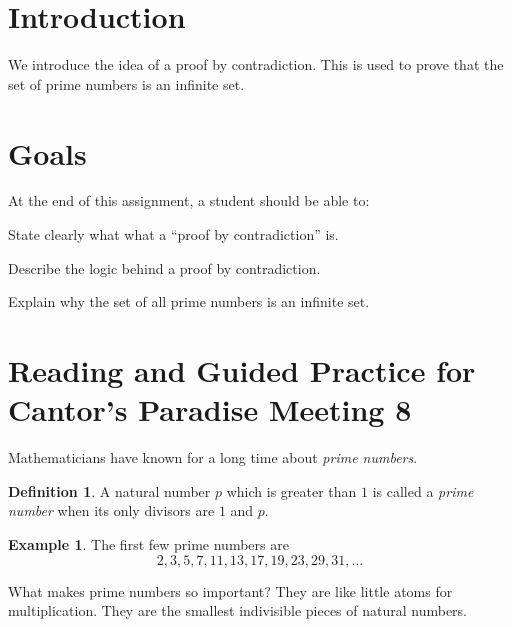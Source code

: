 \documentclass[12pt,letterpaper]{article}
\theoremstyle{definition}
\newtheorem{example}{Example}
\newtheorem*{definition}{Definition}
\begin{document}
\setlength{\parskip}{1ex plus 0.5ex minus 0.2ex}
\setlength{\parindent}{0pt}

\pagestyle{fancy}
\cfoot{}

\section*{Introduction}
We introduce the idea of a proof by contradiction.
This is used to prove that the set of prime numbers is an infinite set.

\section*{Goals}
At the end of this assignment, a student should be able to:
\begin{compactitem}
\item State clearly what what a ``proof by contradiction'' is.
\item Describe the logic behind a proof by contradiction.
\item Explain why the set of all prime numbers is an infinite set.
\end{compactitem}


\section*{Reading and Guided Practice for Cantor's Paradise Meeting 8}

Mathematicians have known for a long time about \emph{prime numbers}.

\begin{definition} 
A natural number $p$ which is greater than $1$ is called a \emph{prime number} when its only divisors are $1$ and $p$.
\end{definition}

\begin{example}
The first few prime numbers are 
\[2, 3, 5, 7, 11, 13, 17, 19, 23, 29, 31, \ldots\]
\end{example}

What makes prime numbers so important?
They are like little atoms for multiplication.
They are the smallest indivisible pieces of natural numbers.
\end{document}
